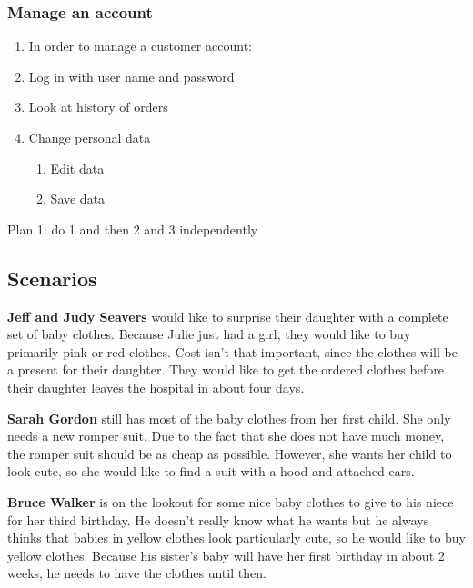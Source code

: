 \subsubsection{Manage an account}
\begin{enumerate}[label*=\arabic*.,start=0,itemsep=-5pt]
  \item In order to manage a customer account:
  \item Log in with user name and password
  \item Look at history of orders
  \item Change personal data
    \begin{enumerate}[label*=\arabic*.,itemsep=-5pt]
      \item Edit data
      \item Save data
    \end{enumerate}
\end{enumerate}
Plan 1: do 1 and then 2 and 3 independently

\subsection{Scenarios}
\textbf{Jeff and Judy Seavers} would like to surprise their daughter with a complete set of baby clothes.
Because Julie just had a girl, they would like to buy primarily pink or red clothes. Cost isn't that important, since the clothes will be a present for their daughter.
They would like to get the ordered clothes before their daughter leaves the hospital in about four days.%

\textbf{Sarah Gordon} still has most of the baby clothes from her first child. She only needs a new romper suit.
Due to the fact that she does not have much money, the romper suit should be as cheap as possible.
However, she wants her child to look cute, so she would like to find a suit with a hood and attached ears.

\textbf{Bruce Walker} is on the lookout for some nice baby clothes to give to his niece for her third birthday.
He doesn't really know what he wants but he always thinks that babies in yellow clothes look particularly cute, so he would like to buy yellow clothes.
Because his sister's baby will have her first birthday in about 2 weeks, he needs to have the clothes until then.

